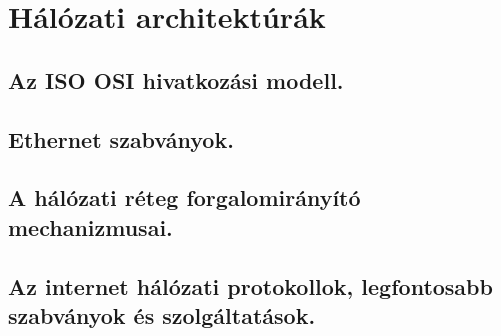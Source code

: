 \section{Hálózati architektúrák}
\subsection{Az ISO OSI hivatkozási modell.}

\subsection{Ethernet szabványok.}

\subsection{A hálózati réteg forgalomirányító mechanizmusai. }

\subsection{Az internet hálózati protokollok, legfontosabb szabványok és szolgáltatások.}
